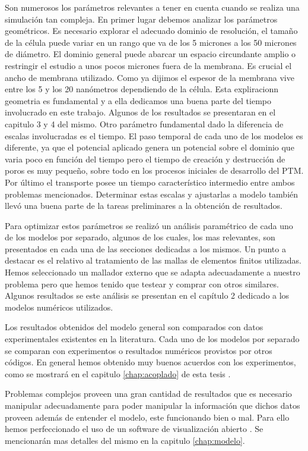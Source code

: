Son numerosos los parámetros relevantes a tener en cuenta cuando se realiza una simulación tan compleja. En primer lugar debemos analizar los parámetros geométricos. Es necesario explorar el adecuado dominio de resolución, el tamaño de la célula puede variar en un rango que va de los 5 micrones a los 50 micrones de diámetro. El dominio general puede abarcar un espacio circundante amplio o restringir el estudio a unos pocos micrones fuera de la membrana. Es crucial el ancho de membrana utilizado. Como ya dijimos el espesor de la membrana vive entre los 5 y los 20 nanómetros dependiendo de la célula. Esta expliracionn geometria es fundamental y a ella dedicamos una buena parte del tiempo involucrado en este trabajo. Algunos de los resultados se presentaran en el capitulo 3 y 4 del mismo. Otro parámetro fundamental dado la diferencia de escalas involucradas es el tiempo. El paso temporal de cada uno de los modelos es diferente, ya que el potencial aplicado genera un potencial sobre el dominio que varia poco en función del tiempo pero el tiempo de creación y destrucción de poros es muy pequeño, sobre todo en los procesos iniciales de desarrollo del PTM. Por último el transporte posee un tiempo característico intermedio entre ambos problemas mencionados. Determinar estas escalas y ajustarlas a modelo también llevó una buena parte de la tareas preliminares a la obtención de resultados.

Para optimizar estos parámetros se realizó un análisis paramétrico de cada uno de los modelos por separado, algunos de los cuales, los mas relevantes, son presentados en cada una de las secciones dedicadas a los mismos. 
Un punto a destacar es el relativo al tratamiento de las mallas de elementos finitos utilizadas. Hemos seleccionado un mallador externo \cite{c11} que se adapta adecuadamente a nuestro problema pero que hemos tenido que testear y comprar con otros similares. Algunos resultados se este análisis se presentan en el capítulo 2 dedicado a los modelos numéricos utilizados.

Los resultados obtenidos del modelo general son comparados con datos experimentales existentes en la literatura. Cada uno de los modelos por separado se comparan con experimentos o resultados numéricos provistos por otros códigos. En general hemos obtenido muy buenos acuerdos con los experimentos, como se mostrará en el capitulo \ref{chap:acoplado} de esta tesis \cite{c6-fodava, krass07, c8}.

 Problemas complejos proveen una gran cantidad de resultados que es necesario manipular adecuadamente para poder manipular la información que dichos datos proveen además de entender el modelo, este funcionando bien o mal. Para ello hemos perfeccionado el uso de un software de visualización abierto \cite{c16}. Se mencionarán mas detalles del mismo en la capitulo \ref{chap:modelo}.
 